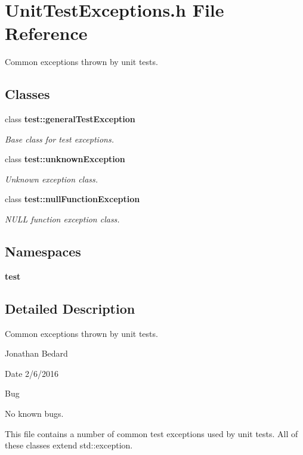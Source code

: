 \section{Unit\+Test\+Exceptions.\+h File Reference}
\label{UnitTestExceptions_8h}


Common exceptions thrown by unit tests.  


\subsection*{Classes}
\begin{DoxyCompactItemize}
\item 
class {\bf test\+::general\+Test\+Exception}
\begin{DoxyCompactList}\small\item\em Base class for test exceptions. \end{DoxyCompactList}\item 
class {\bf test\+::unknown\+Exception}
\begin{DoxyCompactList}\small\item\em Unknown exception class. \end{DoxyCompactList}\item 
class {\bf test\+::null\+Function\+Exception}
\begin{DoxyCompactList}\small\item\em N\+U\+LL function exception class. \end{DoxyCompactList}\end{DoxyCompactItemize}
\subsection*{Namespaces}
\begin{DoxyCompactItemize}
\item 
 {\bf test}
\end{DoxyCompactItemize}


\subsection{Detailed Description}
Common exceptions thrown by unit tests. 

Jonathan Bedard \begin{DoxyDate}{Date}
2/6/2016 
\end{DoxyDate}
\begin{DoxyRefDesc}{Bug}
\item[{\bf Bug}]No known bugs.\end{DoxyRefDesc}


This file contains a number of common test exceptions used by unit tests. All of these classes extend std\+::exception. 